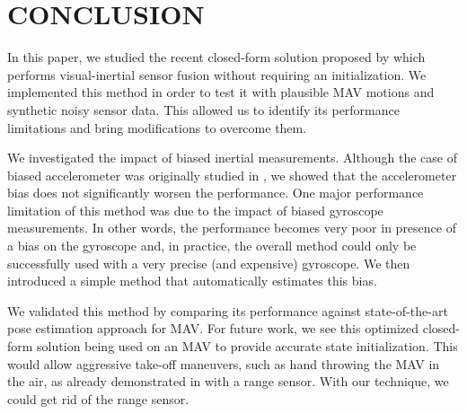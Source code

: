 \documentclass[letterpaper, 10 pt, journal, twoside]{IEEEtran}  %
\begin{document}


\section{CONCLUSION}\label{SectionConclusion}


In this paper, we studied the recent closed-form solution proposed by \cite{Martinelli2014} which performs visual-inertial sensor fusion without requiring an initialization.
We implemented this method in order to test it with plausible MAV motions and synthetic noisy sensor data.
This allowed us to identify its performance limitations and bring modifications to overcome them.

We investigated the impact of biased inertial measurements.
Although the case of biased accelerometer was originally studied in \cite{Martinelli2014}, we showed that the accelerometer bias does not significantly worsen the performance.
One major performance limitation of this method was due to the impact of biased gyroscope measurements.
In other words, the performance becomes very poor in presence of a bias on the gyroscope and, in practice, the overall method could only be successfully used with a very precise (and expensive) gyroscope.
We then introduced a simple method that automatically estimates this bias.

We validated this method by comparing its performance against state-of-the-art pose estimation approach for MAV.
For future work, we see this optimized closed-form solution being used on an MAV to provide accurate state initialization.
This would allow aggressive take-off maneuvers, such as hand throwing the MAV in the air, as already demonstrated in \cite{Faessler2015} with a range sensor.
With our technique, we could get rid of the range sensor.

\pagebreak

\balance
\printbibliography
\end{document}
